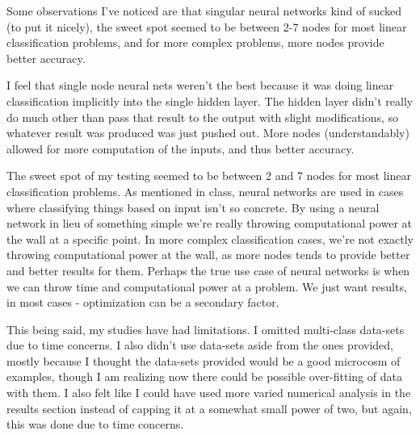 \documentclass[12pt]{extarticle}
\begin{document}
Some observations I've noticed are that singular neural networks kind of sucked (to put it nicely), the sweet spot seemed to be between 2-7 nodes for most linear classification problems, and for more complex problems, more nodes provide better accuracy.

I feel that single node neural nets weren't the best because it was doing linear classification implicitly into the single hidden layer. The hidden layer didn't really do much other than pass that result to the output with slight modifications, so whatever result was produced was just pushed out. More nodes (understandably) allowed for more computation of the inputs, and thus better accuracy.

The sweet spot of my testing seemed to be between 2 and 7 nodes for most linear classification problems. As mentioned in class, neural networks are used in cases where classifying things based on input isn't so concrete. By using a neural network in lieu of something simple we're really throwing computational power at the wall at a specific point. In more complex classification cases, we're not exactly throwing computational power at the wall, as more nodes tends to provide better and better results for them. Perhaps the true use case of neural networks is when we can throw time and computational power at a problem. We just want results, in most cases - optimization can be a secondary factor.

This being said, my studies have had limitations. I omitted multi-class data-sets due to time concerns. I also didn't use data-sets aside from the ones provided, mostly because I thought the data-sets provided would be a good microcosm of examples, though I am realizing now there could be possible over-fitting of data with them. I also felt like I could have used more varied numerical analysis in the results section instead of capping it at a somewhat small power of two, but again, this was done due to time concerns.


\end{document}

